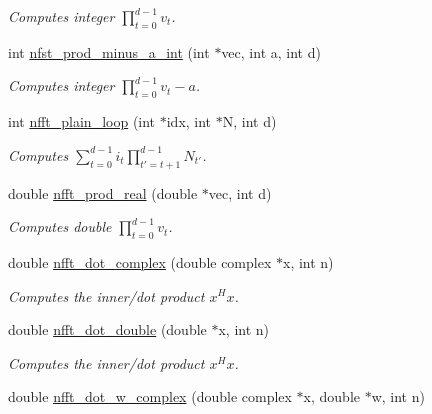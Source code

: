 \begin{CompactItemize}
\begin{CompactList}\small\item\em Computes integer $\prod_{t=0}^{d-1} v_t$. \item\end{CompactList}\item 
\hypertarget{group__nfftutil_ga12}{
int \hyperlink{group__nfftutil_ga12}{nfst\_\-prod\_\-minus\_\-a\_\-int} (int $\ast$vec, int a, int d)}
\label{group__nfftutil_ga12}

\begin{CompactList}\small\item\em Computes integer $\prod_{t=0}^{d-1} v_t-a$. \item\end{CompactList}\item 
\hypertarget{group__nfftutil_ga13}{
int \hyperlink{group__nfftutil_ga13}{nfft\_\-plain\_\-loop} (int $\ast$idx, int $\ast$N, int d)}
\label{group__nfftutil_ga13}

\begin{CompactList}\small\item\em Computes $\sum_{t=0}^{d-1} i_t \prod_{t'=t+1}^{d-1} N_{t'}$. \item\end{CompactList}\item 
\hypertarget{group__nfftutil_ga14}{
double \hyperlink{group__nfftutil_ga14}{nfft\_\-prod\_\-real} (double $\ast$vec, int d)}
\label{group__nfftutil_ga14}

\begin{CompactList}\small\item\em Computes double $\prod_{t=0}^{d-1} v_t$. \item\end{CompactList}\item 
\hypertarget{group__nfftutil_ga15}{
double \hyperlink{group__nfftutil_ga15}{nfft\_\-dot\_\-complex} (double complex $\ast$x, int n)}
\label{group__nfftutil_ga15}

\begin{CompactList}\small\item\em Computes the inner/dot product $x^H x$. \item\end{CompactList}\item 
\hypertarget{group__nfftutil_ga16}{
double \hyperlink{group__nfftutil_ga16}{nfft\_\-dot\_\-double} (double $\ast$x, int n)}
\label{group__nfftutil_ga16}

\begin{CompactList}\small\item\em Computes the inner/dot product $x^H x$. \item\end{CompactList}\item 
\hypertarget{group__nfftutil_ga17}{
double \hyperlink{group__nfftutil_ga17}{nfft\_\-dot\_\-w\_\-complex} (double complex $\ast$x, double $\ast$w, int n)}
\label{group__nfftutil_ga17}


\end{CompactItemize}
